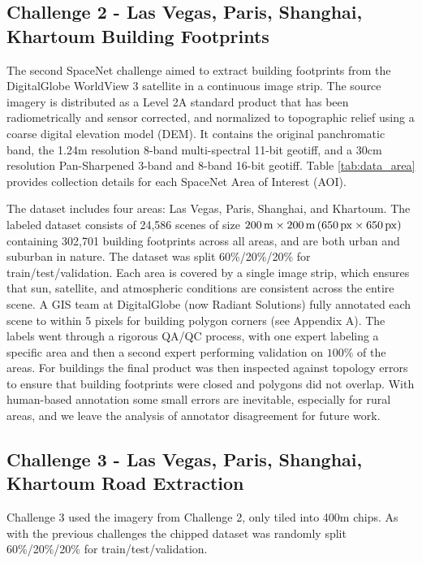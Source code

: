 \documentclass{article}
\begin{document}
\subsection{Challenge 2 - Las Vegas, Paris, Shanghai, Khartoum Building Footprints}

The second SpaceNet challenge aimed to extract building footprints from the DigitalGlobe WorldView 3  satellite in a continuous image strip. The source imagery is distributed as a Level 2A standard product that has been radiometrically and sensor corrected, and normalized to topographic relief using a coarse digital elevation model (DEM). It contains the original panchromatic band, the 1.24m resolution 8-band multi-spectral 11-bit geotiff, and a 30cm resolution Pan-Sharpened 3-band and 8-band 16-bit geotiff. Table \ref{tab:data_area} provides collection details for each SpaceNet Area of Interest (AOI). 

The dataset includes four areas: Las Vegas, Paris, Shanghai, and Khartoum. The labeled dataset consists of 24,586 scenes of size $200 \,\rm{m} \times 200 \,\rm{m} \, (650 \,\rm{px} \times 650 \,\rm{px})$ 
containing 302,701 building footprints across all areas, and are both urban and suburban in nature. 
The dataset was split 60\%/20\%/20\% for train/test/validation.
Each area is covered by a single image strip, which ensures that sun, satellite, and atmospheric conditions are consistent across the entire scene.
 A GIS team at DigitalGlobe (now Radiant Solutions) fully annotated each scene to within 5 pixels for building polygon corners (see Appendix A). The labels went through a rigorous QA/QC process, with one expert labeling a specific area and then a second expert performing validation on $100\%$ of the areas. For buildings the final product was then inspected against topology errors to ensure that building footprints were closed and polygons did not overlap. With human-based annotation some small errors are inevitable, especially for rural areas, and we leave the analysis of annotator disagreement for future work.






\subsection{Challenge 3 - Las Vegas, Paris, Shanghai, Khartoum Road Extraction}

Challenge 3 used the imagery from Challenge 2,  only tiled into 400m chips. As with the previous challenges the chipped dataset was randomly split 60\%/20\%/20\% for train/test/validation.
\end{document}
